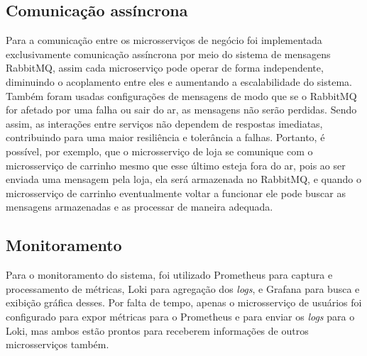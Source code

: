 


\subsection{Comunicação assíncrona}
Para a comunicação entre os microsserviços de negócio foi implementada exclusivamente comunicação assíncrona por meio do sistema de mensagens RabbitMQ, assim cada microserviço pode operar de forma independente, diminuindo o acoplamento entre eles e aumentando a escalabilidade do sistema.
Também foram usadas configurações de mensagens de modo que se o RabbitMQ for afetado por uma falha ou sair do ar, as mensagens não serão perdidas.
Sendo assim, as interações entre serviços não dependem de respostas imediatas, contribuindo para uma maior resiliência e tolerância a falhas. Portanto, é possível, por exemplo, que o microsserviço de loja se comunique com o microsserviço de carrinho mesmo que esse último esteja fora do ar, pois ao ser enviada uma mensagem pela loja, ela será armazenada no RabbitMQ, e quando o microsserviço de carrinho eventualmente voltar a funcionar ele pode buscar as mensagens armazenadas e as processar de maneira adequada. 



\subsection{Monitoramento}
Para o monitoramento do sistema, foi utilizado Prometheus para captura e processamento de métricas, Loki para agregação dos \emph{logs}, e Grafana para busca e exibição gráfica desses. Por falta de tempo, apenas o microsserviço de usuários foi configurado para expor métricas para o Prometheus e para enviar os \emph{logs} para o Loki, mas ambos estão prontos para receberem informações de outros microsserviços também. 

